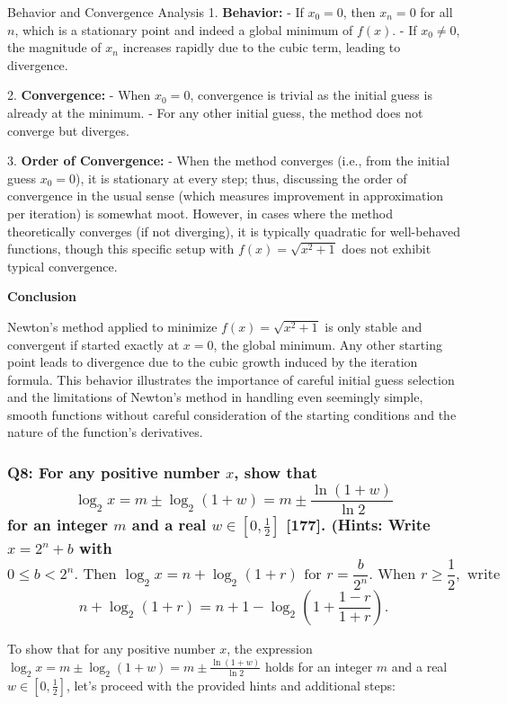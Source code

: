 \documentclass[8pt]{article}
\begin{document}
Behavior and Convergence Analysis\textbf{
}
1. \textbf{Behavior:}
   - If \(x_0 = 0\), then \(x_n = 0\) for all \(n\), which is a stationary point and indeed a global minimum of \(f(x)\).
   - If \(x_0 \neq 0\), the magnitude of \(x_n\) increases rapidly due to the cubic term, leading to divergence.

2. \textbf{Convergence:}
   - When \(x_0 = 0\), convergence is trivial as the initial guess is already at the minimum.
   - For any other initial guess, the method does not converge but diverges.

3. \textbf{Order of Convergence:}
   - When the method converges (i.e., from the initial guess \(x_0 = 0\)), it is stationary at every step; thus, discussing the order of convergence in the usual sense (which measures improvement in approximation per iteration) is somewhat moot. However, in cases where the method theoretically converges (if not diverging), it is typically quadratic for well-behaved functions, though this specific setup with \(f(x) = \sqrt{x^2 + 1}\) does not exhibit typical convergence.

\textbf{Conclusion}

Newton’s method applied to minimize \(f(x) = \sqrt{x^2 + 1}\) is only stable and convergent if started exactly at \(x = 0\), the global minimum. Any other starting point leads to divergence due to the cubic growth induced by the iteration formula. This behavior illustrates the importance of careful initial guess selection and the limitations of Newton's method in handling even seemingly simple, smooth functions without careful consideration of the starting conditions and the nature of the function's derivatives.

\subsubsection*{Q8: For any positive number \(x\), show that
\[ \log_2 x = m \pm \log_2 (1 + w) = m \pm \frac{\ln(1 + w)}{\ln 2} \]
for an integer \(m\) and a real \(w \in \left[0, \frac{1}{2}\right]\) [177]. (Hints: Write \(x = 2^n + b\) with
\[ 0 \leq b < 2^n. \text{ Then } \log_2 x = n + \log_2 (1 + r) \text{ for } r = \frac{b}{2^n}. \text{ When } r \geq \frac{1}{2}, \text{ write } \]
\[ n + \log_2 (1 + r) = n + 1 - \log_2 \left(1 + \frac{1 - r}{1 + r}\right). \]}

To show that for any positive number \(x\), the expression \(\log_2 x = m \pm \log_2 (1 + w) = m \pm \frac{\ln(1 + w)}{\ln 2}\) holds for an integer \(m\) and a real \(w \in \left[0, \frac{1}{2}\right]\), let's proceed with the provided hints and additional steps:
\end{document}
